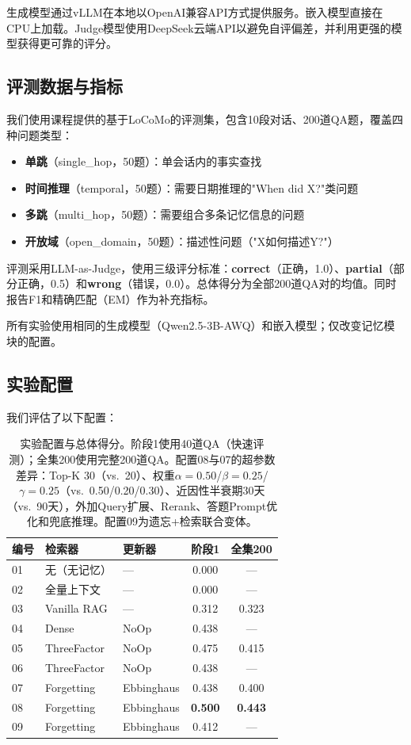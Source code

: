 \documentclass[11pt,a4paper]{ctexart}
\begin{document}
生成模型通过vLLM在本地以OpenAI兼容API方式提供服务。嵌入模型直接在CPU上加载。Judge模型使用DeepSeek云端API以避免自评偏差，并利用更强的模型获得更可靠的评分。

\subsection{评测数据与指标}

我们使用课程提供的基于LoCoMo的评测集，包含10段对话、200道QA题，覆盖四种问题类型：

\begin{itemize}[nosep]
    \item \textbf{单跳}（single\_hop，50题）：单会话内的事实查找
    \item \textbf{时间推理}（temporal，50题）：需要日期推理的"When did X?"类问题
    \item \textbf{多跳}（multi\_hop，50题）：需要组合多条记忆信息的问题
    \item \textbf{开放域}（open\_domain，50题）：描述性问题（"X如何描述Y?"）
\end{itemize}

评测采用LLM-as-Judge，使用三级评分标准：\textbf{correct}（正确，1.0）、\textbf{partial}（部分正确，0.5）和\textbf{wrong}（错误，0.0）。总体得分为全部200道QA对的均值。同时报告F1和精确匹配（EM）作为补充指标。

所有实验使用相同的生成模型（Qwen2.5-3B-AWQ）和嵌入模型；仅改变记忆模块的配置。

\subsection{实验配置}

我们评估了以下配置：

\begin{table}[H]
\centering
\begin{tabular}{@{}lllcc@{}}
\toprule
\textbf{编号} & \textbf{检索器} & \textbf{更新器} & \textbf{阶段1} & \textbf{全集200} \\
\midrule
01 & 无（无记忆） & --- & 0.000 & --- \\
02 & 全量上下文 & --- & 0.000 & --- \\
03 & Vanilla RAG & --- & 0.312 & 0.323 \\
04 & Dense & NoOp & 0.438 & --- \\
05 & ThreeFactor & NoOp & 0.475 & 0.415 \\
06 & ThreeFactor & NoOp & 0.438 & --- \\
07 & Forgetting & Ebbinghaus & 0.438 & 0.400 \\
08 & Forgetting & Ebbinghaus & \textbf{0.500} & \textbf{0.443} \\
09 & Forgetting & Ebbinghaus & 0.412 & --- \\
\bottomrule
\end{tabular}
\caption{实验配置与总体得分。阶段1使用40道QA（快速评测）；全集200使用完整200道QA。配置08与07的超参数差异：Top-K 30（vs.\ 20）、权重$\alpha{=}0.50$/$\beta{=}0.25$/$\gamma{=}0.25$（vs.\ 0.50/0.20/0.30）、近因性半衰期30天（vs.\ 90天），外加Query扩展、Rerank、答题Prompt优化和兜底推理。配置09为遗忘+检索联合变体。}
\label{tab:configs}
\end{table}
\end{document}
